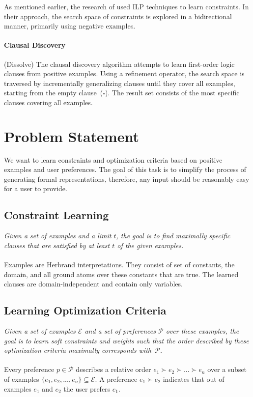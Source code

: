 \documentclass[letterpaper]{article}
\newcommand{\sym}[1]{\ensuremath{\mathcal{#1}}}
\theoremstyle{definition}
\newcommand{\sam}[1]{{\color{red}(#1)}}
\begin{document}
As mentioned earlier, the research of \cite{Lallouet:LearningCP} used ILP techniques to learn constraints.
In their approach, the search space of constraints is explored in a bidirectional manner, primarily using negative examples.

\paragraph{Clausal Discovery} \sam{Dissolve}
The clausal discovery algorithm \cite{DeRaedt:ClausalDiscovery} attempts to learn first-order logic clauses from positive examples.
Using a refinement operator, the search space is traversed by incrementally generalizing clauses until they cover all examples, starting from the empty clause~($\square$).
The result set consists of the most specific clauses covering all examples.


\section{Problem Statement}
\label{sec:problem}
We want to learn constraints and optimization criteria based on positive examples and user preferences.
The goal of this task is to simplify the process of generating formal representations, therefore, any input should be reasonably easy for a user to provide.

\subsection{Constraint Learning}
\emph{Given a set of examples and a limit $t$, the goal is to find maximally specific clauses that are satisfied by at least $t$ of the given examples.}
\\\\
Examples are Herbrand interpretations.
They consist of set of constants, the domain, and all ground atoms over these constants that are true.
The learned clauses are domain-independent and contain only variables.

\subsection{Learning Optimization Criteria}
\emph{Given a set of examples \sym{E} and a set of preferences \sym{P} over these examples, the goal is to learn soft constraints and weights such that the order described by these optimization criteria maximally corresponds with~\sym{P}.}
\\\\
Every preference $p \in \sym{P}$ describes a relative order $e_1 \succ e_2 \succ ... \succ e_n$ over a subset of examples $\{e_1, e_2, ..., e_n\} \subseteq \sym{E}$.
A preference $e_1 \succ e_2$ indicates that out of examples $e_1$ and $e_2$ the user prefers $e_1$.
\end{document}
